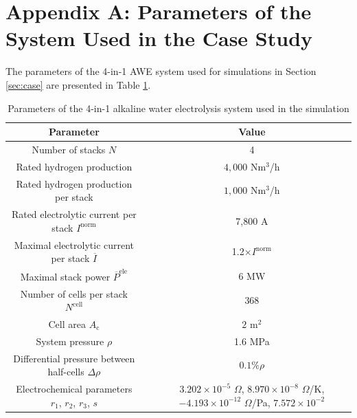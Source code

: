 \documentclass[review,3p,10pt]{elsarticle}
\begin{document}
\break
\section*{Appendix A: Parameters of the System Used in the Case Study}
\label{sec:para}

\setcounter{figure}{0}
\renewcommand{\thefigure}{A\arabic{figure}}
\setcounter{table}{0}
\renewcommand{\thetable}{A\arabic{table}}


The parameters of the 4-in-1 AWE system used for simulations in Section \ref{sec:case} are presented in Table \ref{tab:parameter}.


\begin{table}[h]\scriptsize
  \renewcommand{\arraystretch}{1.12}
  \caption{Parameters of the 4-in-1 alkaline water electrolysis system used in the simulation}\vspace{6pt}
  \label{tab:parameter}
  \centering
  \begin{tabular}{ccc}
  \hline\hline
  Parameter                                                                     & & Value                  \\  \hline
  Number of stacks $N$                                                          & & 4 \\
  Rated hydrogen production                                                     & & $4,000$ Nm$^3$/h \\
  Rated hydrogen production per stack                                           & & $1,000$ Nm$^3$/h \\
  Rated electrolytic current per stack $I^\text{norm}$                          & & 7,800 A \\
  Maximal electrolytic current per stack $\overline{I}$                         & & 1.2$\times I^\text{norm}$ \\
  Maximal stack power $\overline{P}^{\text{ele}}$                               & & $6$  MW \\
  Number of cells per stack  $N^{\text{cell}}$                                  & & $368$   \\
  Cell area $A_{\text{c}}$                                                      & & $2$ m$^2$   \\
  System pressure $\rho$                                                        & & 1.6 MPa  \\
  Differential pressure between half-cells $\Delta \rho$                        & & $0.1\% \rho$   \\
  Electrochemical parameters $r_1$, $r_2$, $r_3$, $s$                           & & $3.202\times10^{-5}$ $\Omega$, $8.970\times10^{-8}$ $\Omega$/K, $-4.193\times 10^{-12}$ $\Omega$/Pa, $7.572\times 10^{-2}$  \\

\end{tabular}
\end{table}
\end{document}
